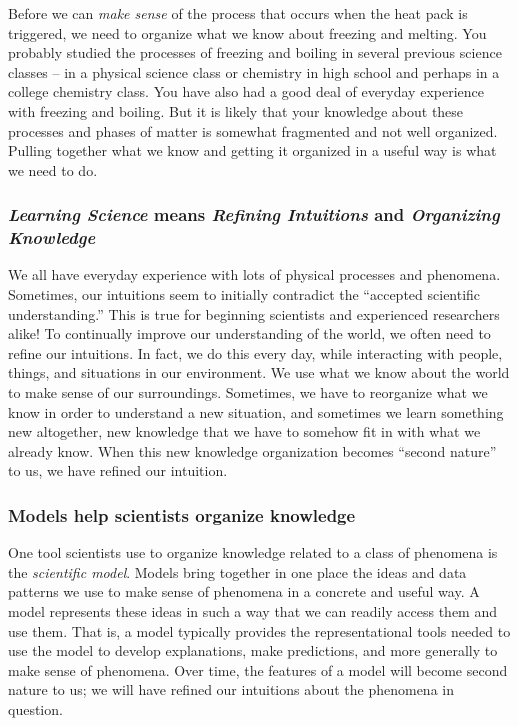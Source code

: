 \begin{reading}
\label{ReadingRefiningIntuitions}

	Before we can {\em make sense} of the process that occurs when the heat pack is triggered, we need to organize what we know about freezing and melting. You probably studied the processes of freezing and boiling in several previous science classes -- in a physical science class or chemistry in high school and perhaps in a college chemistry class. You have also had a good deal of everyday experience with freezing and boiling. But it is likely that your knowledge about these processes and phases of matter is somewhat fragmented and not well organized. Pulling together what we know and getting it organized in a useful way is what we need to do.

	\subsubsection*{{\em Learning Science} means {\em Refining Intuitions} and {\em Organizing Knowledge}}

	We all have everyday experience with lots of physical processes and phenomena. Sometimes, our intuitions seem to initially contradict the ``accepted scientific understanding.'' This is true for beginning scientists and experienced researchers alike! To continually improve our understanding of the world, we often need to refine our intuitions. In fact, we do this every day, while interacting with people, things, and situations in our environment. We use what we know about the world to make sense of our surroundings. Sometimes, we have to reorganize what we know in order to understand a new situation, and sometimes we learn something new altogether, new knowledge that we have to somehow fit in with what we already know. When this new knowledge organization becomes ``second nature'' to us, we have refined our intuition. 

	\subsubsection*{Models help scientists organize knowledge}

	One tool scientists use to organize knowledge related to a class of phenomena is the {\em scientific model}. Models bring together in one place the ideas and data patterns we use to make sense of phenomena in a concrete and useful way. A model represents these ideas in such a way that we can readily access them and use them. That is, a model typically provides the representational tools needed to use the model to develop explanations, make predictions, and more generally to make sense of phenomena. Over time, the features of a model will become second nature to us; we will have refined our intuitions about the phenomena in question.

\end{reading}

